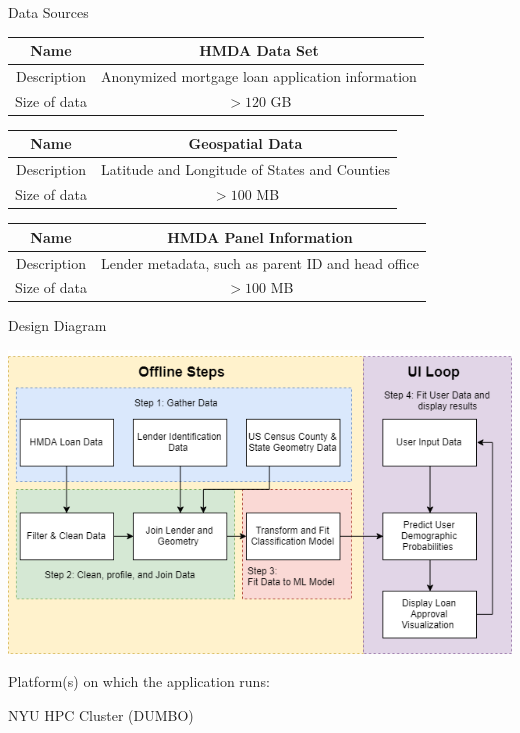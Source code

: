\documentclass{beamer}
\begin{document}
\begin{frame}{Data Sources}

\begin{table}[]
\begin{tabular}{|c|c|}
\hline
Name & HMDA Data Set         \\ \hline
Description                 & Anonymized mortgage loan application information          \\ \hline
Size of data        & $> 120$ GB              \\ \hline
\end{tabular}
\end{table}

\begin{table}[]
\begin{tabular}{|c|c|}
\hline
Name & Geospatial Data         \\ \hline
Description                 & Latitude and Longitude of States and Counties       \\ \hline
Size of data        & $> 100$ MB              \\ \hline
\end{tabular}
\end{table}


\begin{table}[]
\begin{tabular}{|c|c|}
\hline
Name & HMDA Panel Information         \\ \hline
Description                 & Lender metadata, such as parent ID and head office          \\ \hline
Size of data        & $> 100$ MB              \\ \hline
\end{tabular}
\end{table}

\end{frame}


\begin{frame}{Design Diagram}

\includegraphics[width=\linewidth]{SparkDesignDiagram.png}

Platform(s) on which the application runs: \vspace{2mm}

NYU HPC Cluster (DUMBO)

\end{frame}
\end{document}
